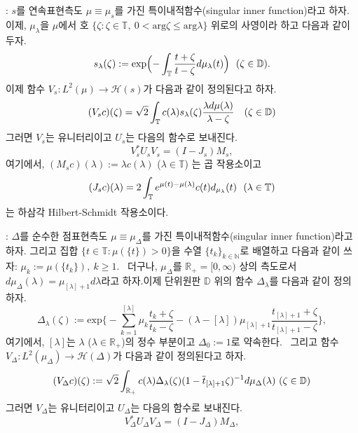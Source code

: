 \documentclass[12pt,a4paper,2sided]{article}
\begin{document}
\newpage {}

\vspace{0.8cm}

 : $s$를 연속표현측도  $\mu\equiv
\mu_{s}\label{mus}$를 가진 특이내적함수(singular inner function)라고
하자. 이제, $\mu_{\lambda}$을 $\mu$에서 호 $\{\zeta: \zeta \in
\mathbb T, \ 0< \text{arg}\zeta \leq \text{arg}\lambda\}$ 위로의
사영이라 하고 다음과 같이 두자.
$$
s_{\lambda}(\zeta)\label{slambdazeta}:=\text{exp}\Bigl(-\int_{\mathbb
T}\frac{t+\zeta}{t-\zeta}d\mu_{\lambda}(t) \Bigr) \ \ \hbox{($\zeta
\in \mathbb D$)}.
$$
이제 함수 $V_s\label{Vs}: L^2(\mu)\to \mathcal H (s)$가 다음과 같이 정의된다고 하자.
\begin{equation}\label{3.4}
(V_s c)(\zeta)=\sqrt{2}\int_{\mathbb
T}c(\lambda)s_{\lambda}(\zeta)\frac{\lambda
d\mu(\lambda)}{\lambda-\zeta}\quad\hbox{($\zeta \in \mathbb D$)}
\end{equation}
그러면 $V_s$는 유니터리이고 $U_s$는 다음의 함수로 보내진다.
\begin{equation}\label{3.5}
V_s^*U_s V_s=(I-J_s)M_s,
\end{equation}
여기에서, $(M_s c)(\lambda):=\lambda c(\lambda)$ ($\lambda\in\mathbb
T$) 는 곱 작용소이고
$$
(J_s\label{Js} c)(\lambda)=2 \int _{\mathbb T} e^{\mu(t)-\mu(\lambda)}
c(t)d_{\mu_{\lambda}}(t)\ \ \hbox{($\lambda \in \mathbb T$)}
$$
는 하삼각 Hilbert-Schmidt 작용소이다. \

\vspace{.3 cm}

 : $\Delta$를 순수한 점표현측도 $\mu\equiv
\mu_{\Delta}\label{mudelta}$를 가진 특이내적함수(singular inner
function)라고 하자. 그리고 집합 $\{t\in \mathbb T: \mu(\{t\})>0
\}$을 수열 $\{t_k\}_{k \in \mathbb N}$로 배열하고 다음과  같이 쓰자:
$\mu_k:=\mu(\{t_k\}), \ k \geq 1$. \  더구나, $\mu_{\Delta}$를
$\mathbb R_{+}=[0, \infty)$ 상의 측도로서
$d\mu_{\Delta}(\lambda)=\mu_{[\lambda]+1}d \lambda$라고 하자.이제
단위원판 $\mathbb D$ 위의 함수
$\Delta_{\lambda}\label{deltalambda}$를 다음과 같이 정의하자.
$$
\Delta_{\lambda}(\zeta):=\text{exp}\Biggl\{-\sum_{k=1}^{[\lambda]}\mu_k
\frac{t_k+\zeta}{t_k-\zeta}-(\lambda-[\lambda])\mu_{[\lambda]+1}
\frac{t_{[\lambda]+1}+\zeta}{t_{[\lambda]+1}-\zeta}\Biggr \},
$$
여기에서, $[\lambda]$는 $\lambda$ ($\lambda \in \mathbb R_{+}$)의
정수 부분이고 $\Delta_0:=1$로 약속한다. \ 그리고 함수
$V_{\Delta}\label{Vdelta}: L^2(\mu_{\Delta})\to \mathcal H
(\Delta)$가 다음과 같이 정의된다고 하자.
\begin{equation}\label{3.6}
(V_{\Delta}c)(\zeta):=\sqrt{2} \int_{\mathbb
R_{+}}c(\lambda)\Delta_{\lambda}(\zeta)(1-\overline{t}_{[\lambda]+1}
\zeta)^{-1}d\mu_{\Delta}(\lambda) \ \hbox{($\zeta \in \mathbb D$)}
\end{equation}
그러면 $V_{\Delta}$는 유니터리이고 $U_\Delta$는 다음의 함수로 보내진다.
\begin{equation}\label{3.7}
V_{\Delta}^*U_\Delta V_{\Delta}=(I-J_{\Delta})M_{\Delta},
\end{equation}
\end{document}
